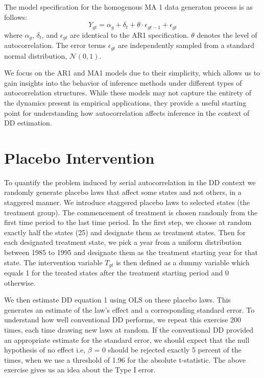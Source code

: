 \documentclass[11pt, a4paper, leqno]{article}
\begin{document}
The model specification for the homogenous MA 1 data generaton process is as follows:
\begin{equation}
Y_{gt} = \alpha_g + \delta_t + \theta \cdot \epsilon_{gt-1} + \epsilon_{gt} \label{eq:3}
\end{equation}
where $\alpha_g$, $\delta_t$, and $\epsilon_{gt}$ are identical to the AR1 specification. $\theta$ denotes the level of autocorrelation. 
The error terms $\epsilon_{gt}$ are independently sampled from a standard normal distribution, $\mathcal{N}(0,1)$. 

We focus on the AR1 and MA1 models due to their simplicity, which allows us to gain insights into the behavior of inference methods under different types of autocorrelation structures. While these models may not capture the entirety of the dynamics present in empirical 
applications, they provide a useful starting point for understanding how autocorrelation affects inference in the context of DD estimation.

\section{Placebo Intervention} %
\label{sec:Placebo}

To quantify the problem induced by serial autocorrelation in the DD context we randomly generate placebo laws that affect some states and not others, in a staggered manner. We introduce staggered placebo laws to selected states (the treatment group). The commencement of treatment is chosen randomly from the first time period to the last time period.
In the first step, we choose at random exactly half the states (25) and designate them as treatment states. Then for each designated treatment state, we pick a year from a uniform distribution between 1985 to 1995 and designate them as the treatment starting year for that state. The intervention variable $T_{gt}$ is then defined as a dummy variable which 
equals 1 for the treated states after the treatment starting period and 0 otherwise.

We then estimate DD equation 1 using OLS on these placebo laws. This generates an estimate of the law's effect and a corresponding standard error. To understand how well conventional DD performs, we repeat this exercise 200 times, each time drawing new laws at random. If the conventional DD provided an appropriate estimate for the standard error, we should expect 
that the null hypothesis of no effect i.e, $\beta$ = 0 should be rejected exactly 5 percent of the times, when we use a threshold of 1.96 for the absolute t-statistic. The above exercise gives us an idea about the Type I error. 
\end{document}
